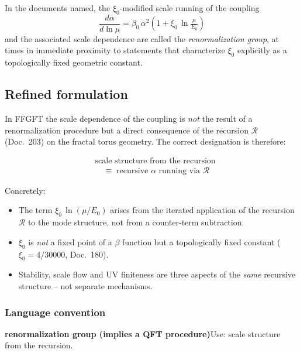 In the documents named, the $\xi_0$-modified scale running of the coupling
\begin{equation}
  \frac{d\alpha}{d\ln\mu}
  = \beta_0\,\alpha^2\!\left(1 + \xi_0\,\ln\tfrac{\mu}{E_0}\right)
  \tag{old -- imprecise}
\end{equation}
and the associated scale dependence are called the \emph{renormalization
group}, at times in immediate proximity to statements that characterize
$\xi_0$ explicitly as a topologically fixed geometric constant.

\subsection*{Refined formulation}

In FFGFT the scale dependence of the coupling is \emph{not} the result of a
renormalization procedure but a direct consequence of the recursion
$\mathcal{R}$ (Doc.~203) on the fractal torus geometry. The correct designation
is therefore:

\begin{equation}
  \boxed{\;
  \begin{aligned}
    &\text{scale structure from the recursion} \\
    &\quad\equiv\; \text{recursive $\alpha$ running via $\mathcal{R}$}
  \end{aligned}
  \;}
  \tag{190.12}
\end{equation}

Concretely:
\begin{itemize}
  \item The term $\xi_0\,\ln(\mu/E_0)$ arises from the iterated application of
        the recursion $\mathcal{R}$ to the mode structure, not from a
        counter-term subtraction.
  \item $\xi_0$ is \emph{not} a fixed point of a $\beta$ function but a
        topologically fixed constant ($\xi_0 = 4/30000$, Doc.~180).
  \item Stability, scale flow and UV finiteness are three aspects of the
        \emph{same} recursive structure -- not separate mechanisms.
\end{itemize}

\subsubsection*{Language convention}

\smallskip\noindent \textbf{renormalization group (implies a QFT procedure)}\quad Use: scale structure from the recursion.

